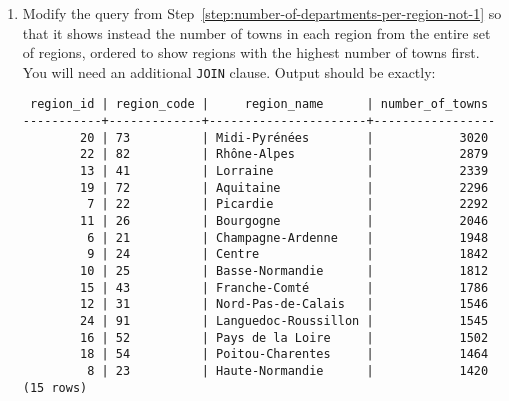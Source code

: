 \begin{enumerate}
\item
  Modify the query from Step~\ref{step:number-of-departments-per-region-not-1} so that it shows instead the number of towns in each region from the entire set of regions, ordered to show regions with the highest number of towns first.
  You will need an additional \texttt{JOIN} clause.
  Output should be exactly: 
\begin{verbatim}
 region_id | region_code |     region_name      | number_of_towns
-----------+-------------+----------------------+-----------------
        20 | 73          | Midi-Pyrénées        |            3020
        22 | 82          | Rhône-Alpes          |            2879
        13 | 41          | Lorraine             |            2339
        19 | 72          | Aquitaine            |            2296
         7 | 22          | Picardie             |            2292
        11 | 26          | Bourgogne            |            2046
         6 | 21          | Champagne-Ardenne    |            1948
         9 | 24          | Centre               |            1842
        10 | 25          | Basse-Normandie      |            1812
        15 | 43          | Franche-Comté        |            1786
        12 | 31          | Nord-Pas-de-Calais   |            1546
        24 | 91          | Languedoc-Roussillon |            1545
        16 | 52          | Pays de la Loire     |            1502
        18 | 54          | Poitou-Charentes     |            1464
         8 | 23          | Haute-Normandie      |            1420
(15 rows)
\end{verbatim}
  
\end{enumerate}



